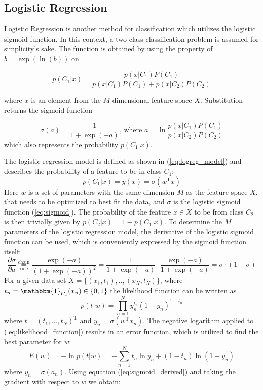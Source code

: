 \subsection{Logistic Regression}
Logistic Regression is another method for classification which utilizes the logistic sigmoid function. In this context, a two-class classification problem is assumed for simplicity's sake. The function is obtained by using the property of $b = \exp(\ln(b))$ on 

\begin{equation}
	p(C_1|x)  = \frac{p(x|C_1)P(C_1)}{p(x|C_1)P(C_1)+p(x|C_2)P(C_2)}
\end{equation}

where $x$ is an element from the $M$-dimensional feature space $X$. Substitution returns the sigmoid function 

\begin{equation} \label{eq:sigmoid}
\sigma(a) = \frac{1}{1 + \exp(-a)} \text{, where } a = \ln\frac{p(x|C_1)P(C_1)}{p(x|C_2)P(C_2)}
\end{equation}
which also represents the probability $p(C_1|x)$. 

The logistic regression model is defined as shown in (\ref{eq:logreg_model}) and describes the probability of a feature to be in class $C_1$:
\begin{equation} \label{eq:logreg_model}
p(C_1|x) = y(x) = \sigma(w^\text{T}x)
\end{equation}
Here $w$ is a set of parameters with the same dimension $M$ as the feature space $X$, that needs to be optimized to best fit the data, and $\sigma$ is the logistic sigmoid function (\ref{eq:sigmoid}). The probability of the feature $x \in X$ to be from class $C_2$ is then trivially given by $p(C_2|x) = 1 - p(C_1|x)$. To determine the $M$ parameters of the logistic regression model, the derivative of the logistic sigmoid function can be used, which is conveniently expressed by the sigmoid function itself:
\begin{equation} \label{eq:sigmoid_derived}
\frac{\partial \sigma}{\partial a} \overset{\text{chain}}{\underset{\text{rule}}{=}} \frac{\exp(-a)}{(1+\exp(-a))^2} = \frac{1}{1+\exp(-a)} \cdot \frac{\exp(-a)}{1+\exp(-a)}= \sigma \cdot(1-\sigma)
\end{equation}
For a given data set $X = \{(x_1,t_1), .. , (x_N,t_N)\}$, where $t_n = \mathbbm{1}_{C_1}(x_n) \in \{0,1\}$ the likelihood function can be written as
\begin{equation} \label{eq:likelihood_function}
p(t|w)=\prod_{n=1}^{N}y_n^{t_n} (1-y_n)^{1-t_n}
\end{equation}
where $t=(t_1, \dots, t_N)^\text{T}$ and $y_n = \sigma(w^\text{T}x_n)$. 
The negative logarithm applied to (\ref{eq:likelihood_function}) results in an error function, which is utilized to find the best parameter for $w$:
\begin{equation} \label{eq:likelihood_function}
E(w)=-\ln p(t|w) = - \sum_{n=1}^{N}t_n \ln y_n + (1-t_n) \ln (1-y_n)
\end{equation}
where $y_n=\sigma(a_n)$. Using equation (\ref{eq:sigmoid_derived}) and taking the gradient with respect to $w$ we obtain:

